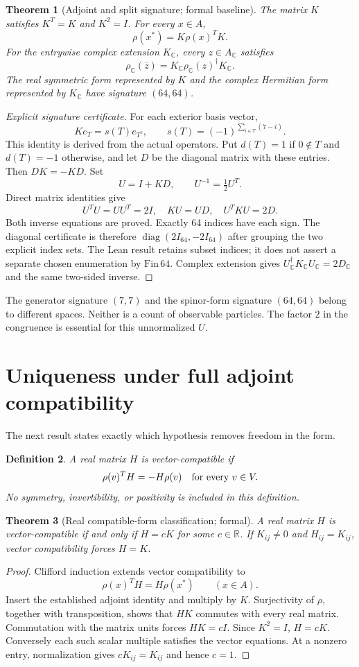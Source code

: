 \documentclass[11pt]{article}
\newtheorem{theorem}{Theorem}[section]
\newtheorem{definition}[theorem]{Definition}
\newcommand{\R}{\mathbb R}
\newcommand{\C}{\mathbb C}
\begin{document}
\begin{theorem}[Adjoint and split signature; formal baseline]
The matrix $K$ satisfies $K^T=K$ and $K^2=I$. For every $x\in A$,
\[
 \rho(x^*)=K\rho(x)^T K.
\]
For the entrywise complex extension $K_\C$, every $z\in A_\C$ satisfies
\[
 \rho_\C(\overline z)=K_\C\rho_\C(z)^\dagger K_\C.
\]
The real symmetric form represented by $K$ and the complex Hermitian form represented by $K_\C$ have signature $(64,64)$.
\end{theorem}
\begin{proof}[Explicit signature certificate]
For each exterior basis vector,
\[
 K e_T=s(T)e_{T^c},\qquad
 s(T)=(-1)^{\sum_{i\in T}(7-i)}.
\]
This identity is derived from the actual operators. Put $d(T)=1$ if $0\notin T$ and $d(T)=-1$ otherwise, and let $D$ be the diagonal matrix with these entries. Then $DK=-KD$. Set
\[
 U=I+KD,\qquad U^{-1}=\tfrac12 U^T.
\]
Direct matrix identities give
\[
 U^TU=UU^T=2I,\quad KU=UD,\quad U^TKU=2D.
\]
Both inverse equations are proved. Exactly 64 indices have each sign. The diagonal certificate is therefore $\operatorname{diag}(2I_{64},-2I_{64})$ after grouping the two explicit index sets. The Lean result retains subset indices; it does not assert a separate chosen enumeration by $\mathrm{Fin}\,64$. Complex extension gives $U_\C^\dagger K_\C U_\C=2D_\C$ and the same two-sided inverse.
\end{proof}

The generator signature $(7,7)$ and the spinor-form signature $(64,64)$ belong to different spaces. Neither is a count of observable particles. The factor $2$ in the congruence is essential for this unnormalized $U$.

\section{Uniqueness under full adjoint compatibility}
The next result states exactly which hypothesis removes freedom in the form.

\begin{definition}
A real matrix $H$ is vector-compatible if
\[
 \rho(v)^T H=-H\rho(v)\quad\hbox{for every }v\in V.
\]
No symmetry, invertibility, or positivity is included in this definition.
\end{definition}

\begin{theorem}[Real compatible-form classification; formal]
A real matrix $H$ is vector-compatible if and only if $H=cK$ for some $c\in\R$. If $K_{ij}\ne0$ and $H_{ij}=K_{ij}$, vector compatibility forces $H=K$.
\end{theorem}
\begin{proof}
Clifford induction extends vector compatibility to
\[
 \rho(x)^T H=H\rho(x^*)\qquad(x\in A).
\]
Insert the established adjoint identity and multiply by $K$. Surjectivity of $\rho$, together with transposition, shows that $HK$ commutes with every real matrix. Commutation with the matrix units forces $HK=cI$. Since $K^2=I$, $H=cK$. Conversely each such scalar multiple satisfies the vector equations. At a nonzero entry, normalization gives $cK_{ij}=K_{ij}$ and hence $c=1$.
\end{proof}
\end{document}
